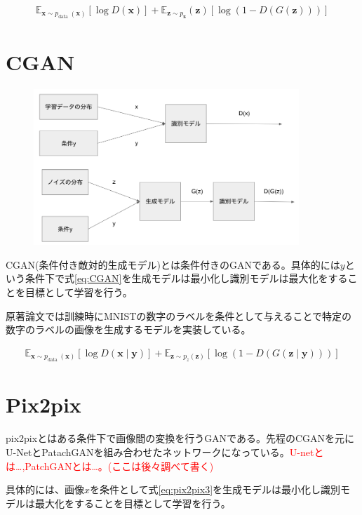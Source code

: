 \begin{align}
\label{eq:GAN}
    \mathbb{E}_{\boldsymbol{x} \sim p_{\text {data }}(\boldsymbol{x})}[\log D(\boldsymbol{x})]+\mathbb{E}_{\boldsymbol{z} \sim p_{\boldsymbol{z}}}(\boldsymbol{z})[\log (1-D(G(\boldsymbol{z})))]
\end{align}

\section{CGAN}

\begin{figure}[h]
    \includegraphics[width=10.0cm]{figure/CGAN.png}
\end{figure}

CGAN(条件付き敵対的生成モデル)とは条件付きのGANである。具体的には$y$という条件下で式\ref{eq:CGAN}を生成モデルは最小化し識別モデルは最大化をすることを目標として学習を行う\cite{CGAN}。\par
原著論文では訓練時にMNISTの数字のラベルを条件として与えることで特定の数字のラベルの画像を生成するモデルを実装している。


\begin{align}
    \label{eq:CGAN}
    \mathbb{E}_{\boldsymbol{x} \sim p_{\text {data }}(\boldsymbol{x})}[\log D(\boldsymbol{x} \mid \boldsymbol{y})]+\mathbb{E}_{\boldsymbol{z} \sim p_{z}(\boldsymbol{z})}[\log (1-D(G(\boldsymbol{z} \mid \boldsymbol{y})))]
\end{align}


\section{Pix2pix}

pix2pixとはある条件下で画像間の変換を行うGANである。先程のCGANを元にU-NetとPatachGANを組み合わせたネットワークになっている。\textcolor{red}{U-netとは…,PatchGANとは…。(ここは後々調べて書く)}\par
具体的には、画像$x$を条件として式\ref{eq:pix2pix3}を生成モデルは最小化し識別モデルは最大化をすることを目標として学習を行う\cite{pix2pix}。

